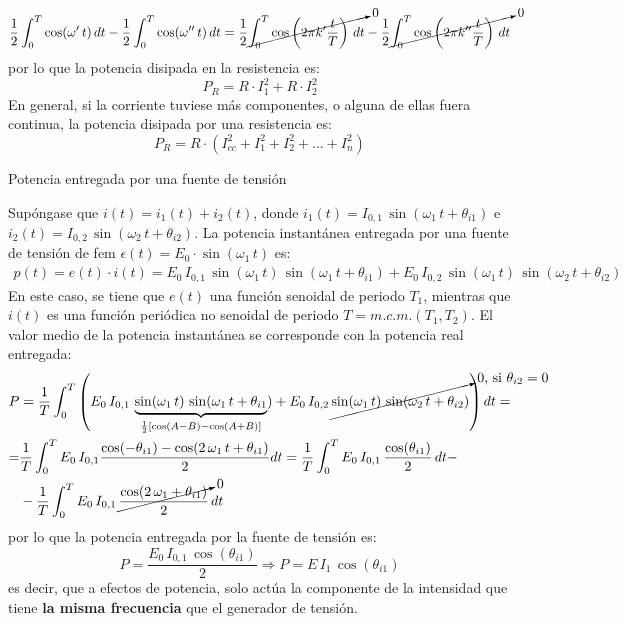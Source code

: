 \documentclass[11pt]{book} %
\makeatletter
\numberwithin{dummy}{section}
\theoremstyle{ocrenumbox}
\theoremstyle{blacknumex}
\theoremstyle{blacknumbox}
\theoremstyle{ocrenum}
\renewcommand{\subsubsection}{\@startsection {subsubsection}{3}{\z@}
{-2ex \@plus -0.1ex \@minus -.2ex}
{.2ex \@plus.2ex }
{\normalfont\small\sffamily\bfseries}}
\newlength\esp
\makeatother
\begin{document}
\begin{equation*}
    \dfrac{1}{2}\int_0^T\cos(\omega'\,t)\,dt-\dfrac{1}{2}\int_0^T\cos(\omega''\,t)\,dt=\dfrac{1}{2}\cancelto{0}{\int_0^T \cos\left(2\pi k'\dfrac{t}{T}\right)\,dt}-\dfrac{1}{2}\cancelto{0}{\int_0^T\cos\left(2\pi k''\dfrac{t}{T}\right)\,dt}
\end{equation*}
por lo que la potencia disipada en la resistencia es:
\begin{equation*}
   P_R=R\cdot I_1^2+R\cdot I_2^2
\end{equation*}
En general, si la corriente tuviese más componentes, o alguna de ellas fuera continua, la potencia disipada por una resistencia es:
\begin{equation}\label{eq.P_R_superposicion}
    \boxed{P_R=R\cdot\left(I_{cc}^2+I_1^2+I_2^2+...+I_n^2 \right)}
\end{equation}

    \subsubsection{Potencia entregada por una fuente de tensión}
    
    Supóngase que $i(t) = i_1(t) + i_2(t)$, donde $i_1(t)=I_{0,1}\,\sin(\omega_1\,t+\theta_{i1})$ e $i_2(t)=I_{0,2}\,\sin(\omega_2\,t+\theta_{i2})$. La potencia instantánea entregada por una fuente de tensión de fem $\epsilon(t)=E_0\cdot\sin(\omega_1\,t)$ es:
\begin{align*}
  p(t) = e(t)\cdot i(t) = E_0\, I_{0,1}\,\sin(\omega_1\,t)\,\sin(\omega_1\,t+\theta_{i1}) + E_0\, I_{0,2}\,\sin(\omega_1\,t)\,\sin(\omega_2\,t+\theta_{i2})
\end{align*} 
En este caso, se tiene que $e(t)$ una función senoidal de periodo $T_1$, mientras que $i(t)$ es una función periódica no senoidal de periodo $T=m.c.m.(T_1,T_2)$. El valor medio de la potencia instantánea se corresponde con la potencia real entregada:
\begin{align*}
    P&=\dfrac{1}{T}\int_0^{T}\left( E_0\, I_{0,1}\,\underbrace{\sin(\omega_1\,t)\,\sin(\omega_1\,t+\theta_{i1}}_{\frac{1}{2}\left[\cos(A-B)-\cos(A+B)\right]}) + E_0\, I_{0,2}\,\cancelto{\text{0, si $\theta_{i2}=0$}}{\sin(\omega_1\,t)\,\sin(\omega_2\,t+\theta_{i2})}\right)dt=\\
    =&\dfrac{1}{T}\int_0^T E_0\,I_{0,1}\dfrac{\cos(-\theta_{i1})-\cos(2\,\omega_1\,t+\theta_{i1})}{2}dt =\dfrac{1}{T}\int_0^T E_0\,I_{0,1}\,\dfrac{\cos(\theta_{i1})}{2}\,dt-\\
    &-\dfrac{1}{T}\int_0^T E_0\,I_{0,1}\,\cancelto{0}{\dfrac{\cos(2\,\omega_1+\theta_{i1})}{2}}\,dt
\end{align*}
por lo que la potencia entregada por la fuente de tensión es:
\begin{equation}\label{eq.P_E_superposicion}
    P=\dfrac{E_0\,I_{0,1}\,\cos(\theta_{i1})}{2}\Rightarrow \boxed{P=E\,I_1\,\cos(\theta_{i1})}
\end{equation}
es decir, que a efectos de potencia, solo actúa la componente de la intensidad que tiene \textbf{la misma frecuencia} que el generador de tensión.
\end{document}
